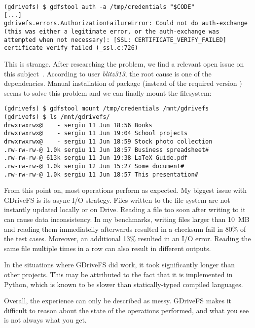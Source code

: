 \begin{lstlisting}[caption=GDriveFS authentication error]
(gdrivefs) $ gdfstool auth -a /tmp/credentials "$CODE"
[...]
gdrivefs.errors.AuthorizationFailureError: Could not do auth-exchange (this was either a legitimate error, or the auth-exchange was attempted when not necessary): [SSL: CERTIFICATE_VERIFY_FAILED] certificate verify failed (_ssl.c:726)
\end{lstlisting}

This is strange. After researching the problem, we find a relevant open issue on this subject~\cite{gdrivefs_ssl_handshake_error}. According to user \emph{blitz313}, the root cause is one of the dependencies. Manual installation of package  (instead of the required version ) seems to solve this problem and we can finally mount the filesystem:

\begin{lstlisting}[caption=GDriveFS filesystem mount]
(gdrivefs) $ gdfstool mount /tmp/credentials /mnt/gdrivefs
(gdrivefs) $ ls /mnt/gdrivefs/
drwxrwxrwx@    - sergiu 11 Jun 18:56 Books
drwxrwxrwx@    - sergiu 11 Jun 19:04 School projects
drwxrwxrwx@    - sergiu 11 Jun 18:59 Stock photo collection
.rw-rw-rw-@ 1.0k sergiu 11 Jun 18:57 Business spreadsheet#
.rw-rw-rw-@ 613k sergiu 11 Jun 19:38 LaTeX Guide.pdf
.rw-rw-rw-@ 1.0k sergiu 12 Jun 15:27 Some document#
.rw-rw-rw-@ 1.0k sergiu 11 Jun 18:57 This presentation#
\end{lstlisting}

From this point on, most operations perform as expected. My biggest issue with GDriveFS is its async I/O strategy. Files written to the file system are not instantly updated locally or on Drive. Reading a file too soon after writing to it can cause data inconsistency. In my benchmarks, writing files larger than \mbox{10 MB} and reading them immediatelly afterwards resulted in a checksum fail in 80\% of the test cases. Moreover, an additional 13\% resulted in an I/O error. Reading the same file multiple times in a row can also result in different outputs.

In the situations where GDriveFS did work, it took significantly longer than other projects. This may be attributed to the fact that it is implemented in Python, which is known to be slower than statically-typed compiled languages.

Overall, the experience can only be described as messy. GDriveFS makes it difficult to reason about the state of the operations performed, and what you see is not always what you get.

